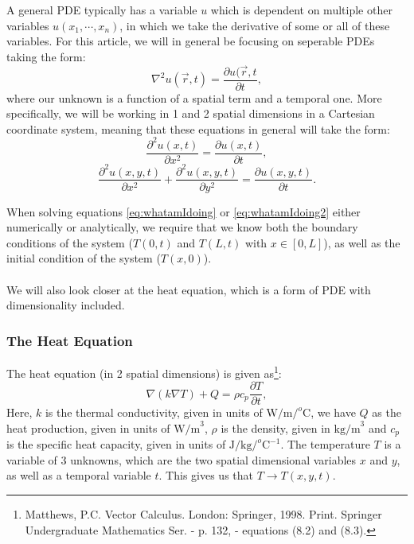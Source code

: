 \documentclass[reprint,english,notitlepage]{revtex4-1}  %
\begin{document}
A general PDE typically has a variable $u$ which is dependent on multiple other variables $u(x_1,\cdots,x_n)$, in which we take the derivative of some or all of these variables. For this article, we will in general be focusing on seperable PDEs taking the form:
\begin{equation}
    \nabla^2 u(\Vec{r},t) = \frac{\partial u(\Vec{r},t}{\partial t},
\end{equation}
where our unknown is a function of a spatial term and a temporal one. More specifically, we will be working in 1 and 2 spatial dimensions in a Cartesian coordinate system, meaning that these equations in general will take the form:
\begin{equation}\label{eq:whatamIdoing}
    \frac{\partial^2 u(x,t)}{\partial x^2} = \frac{\partial u(x,t)}{\partial t},
\end{equation}
\begin{equation}\label{eq:whatamIdoing2}
    \frac{\partial^2 u(x,y,t)}{\partial x^2} + \frac{\partial^2 u(x,y,t)}{\partial y^2} = \frac{\partial u(x,y,t)}{\partial t}.
\end{equation}

When solving equations \ref{eq:whatamIdoing} or \ref{eq:whatamIdoing2} either numerically or analytically, we require that we know both the boundary conditions of the system ($T(0,t)$ and $T(L,t)$ with $x \in [0,L]$), as well as the initial condition of the system ($T(x,0)$).
\\
\\
We will also look closer at the heat equation, which is a form of PDE with dimensionality included.

\subsubsection{The Heat Equation}

The heat equation (in 2 spatial dimensions) is given as\footnote{Matthews, P.C. Vector Calculus. London: Springer, 1998. Print. Springer Undergraduate Mathematics Ser. - p. 132, - equations (8.2) and (8.3).}:
\begin{equation}\label{eq:HeatEquationFoReal}
    \nabla(k\nabla T)+Q = \rho c_p \frac{\partial T}{\partial t},
\end{equation}
Here, $k$ is the thermal conductivity, given in units of $\text{W/m/}^o\text{C}$, we have $Q$ as the heat production, given in units of $\text{W/m}^3$, $\rho$ is the density, given in $\text{kg/m}^3$ and $c_p$ is the specific heat capacity, given in units of $\text{J/kg/}^o\text{C}^{-1}$. The temperature $T$ is a variable of 3 unknowns, which are the two spatial dimensional variables $x$ and $y$, as well as a temporal variable $t$. This gives us that $T \rightarrow T(x,y,t)$.
\end{document}
